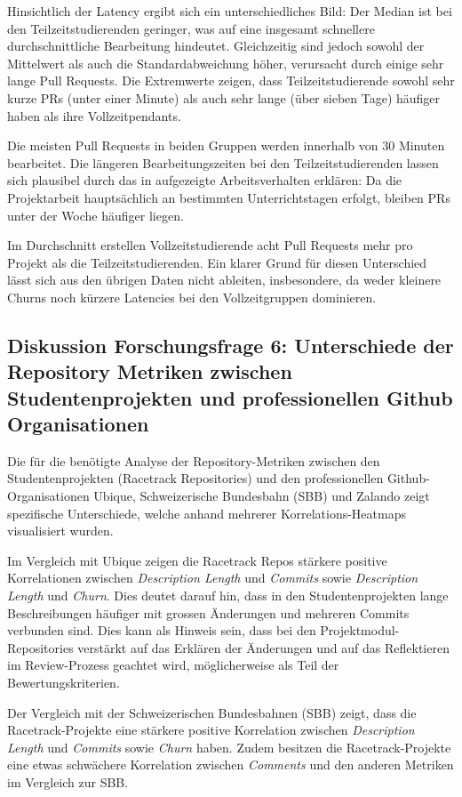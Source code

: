 Hinsichtlich der Latency ergibt sich ein unterschiedliches Bild: Der Median ist bei den Teilzeitstudierenden geringer, was auf eine insgesamt schnellere durchschnittliche Bearbeitung hindeutet. Gleichzeitig sind jedoch sowohl der Mittelwert als auch die Standardabweichung höher, verursacht durch einige sehr lange Pull Requests. Die Extremwerte zeigen, dass Teilzeitstudierende sowohl sehr kurze PRs (unter einer Minute) als auch sehr lange (über sieben Tage) häufiger haben als ihre Vollzeitpendants.

Die meisten Pull Requests in beiden Gruppen werden innerhalb von 30 Minuten bearbeitet. Die längeren Bearbeitungszeiten bei den Teilzeitstudierenden lassen sich plausibel durch das in  aufgezeigte Arbeitsverhalten erklären: Da die Projektarbeit hauptsächlich an bestimmten Unterrichtstagen erfolgt, bleiben PRs unter der Woche häufiger liegen.

Im Durchschnitt erstellen Vollzeitstudierende acht Pull Requests mehr pro Projekt als die Teilzeitstudierenden. Ein klarer Grund für diesen Unterschied lässt sich aus den übrigen Daten nicht ableiten, insbesondere, da weder kleinere Churns noch kürzere Latencies bei den Vollzeitgruppen dominieren. 

\subsection{Diskussion Forschungsfrage 6: Unterschiede der Repository Metriken zwischen Studentenprojekten und professionellen Github Organisationen}
Die für die  benötigte Analyse der Repository-Metriken zwischen den Studentenprojekten (Racetrack Repositories) und den professionellen Github-Organisationen Ubique, Schweizerische Bundesbahn (SBB) und Zalando zeigt spezifische Unterschiede, welche anhand mehrerer Korrelations-Heatmaps visualisiert wurden. 

Im Vergleich mit Ubique zeigen die Racetrack Repos stärkere positive Korrelationen zwischen \textit{Description Length} und \textit{Commits} sowie \textit{Description Length} und \textit{Churn}. Dies deutet darauf hin, dass in den Studentenprojekten lange Beschreibungen häufiger mit grossen Änderungen und mehreren Commits verbunden sind. Dies kann als Hinweis sein, dass bei den Projektmodul-Repositories verstärkt auf das Erklären der Änderungen und auf das Reflektieren im Review-Prozess geachtet wird, möglicherweise als Teil der Bewertungskriterien. 

Der Vergleich mit der Schweizerischen Bundesbahnen (SBB) zeigt, dass die Racetrack-Projekte eine stärkere positive Korrelation zwischen \textit{Description Length} und \textit{Commits} sowie \textit{Churn} haben. Zudem besitzen die Racetrack-Projekte eine etwas schwächere Korrelation zwischen \textit{Comments} und den anderen Metriken im Vergleich zur SBB.

